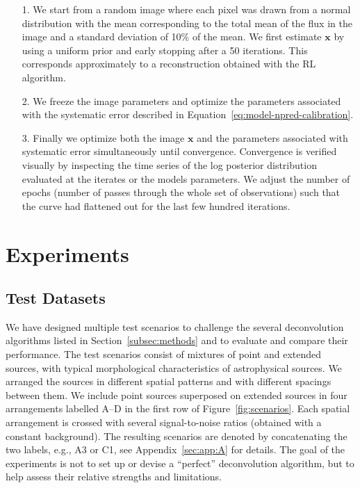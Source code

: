 \documentclass[twocolumn]{aastex631}
\begin{document}
    \begin{itemize}
        \item[1.] We start from a random image where each pixel was drawn from a normal distribution with the mean corresponding to the total mean of the flux in the image and a standard deviation of 10\% of the mean. We first estimate $\mathbf{x}$ by using a uniform prior and early stopping after a 50 iterations. This corresponds approximately to a reconstruction obtained with the RL algorithm. 
        \item[2.] We freeze the image parameters and optimize the parameters associated with the systematic error described in Equation~\ref{eq:model-npred-calibration}.
        \item[3.] Finally we optimize both the image $\mathbf{x}$ and the parameters associated with systematic error simultaneously until convergence. Convergence is verified visually by inspecting the time series of the log posterior distribution evaluated at the iterates or the models parameters. We adjust the number of epochs (number of passes through the whole set of observations) such that the curve had flattened out for the last few hundred iterations.
    \end{itemize}
    
    \section{Experiments}
    \subsection{Test Datasets}
    \label{subsec:test-datasets}
    We have designed multiple test scenarios to challenge the several deconvolution algorithms listed in Section~\ref{subsec:methods} and to evaluate and compare their performance. The test scenarios consist of mixtures of point and extended sources, with typical morphological characteristics of astrophysical sources. We arranged the sources in different spatial patterns and with different spacings between them. We include point sources superposed on extended sources in four arrangements labelled A--D in the first row of Figure~\ref{fig:scenarios}. Each spatial arrangement is crossed with several signal-to-noise ratios (obtained with a constant background). The resulting scenarios are denoted by concatenating the two labels, e.g., A3 or C1, see Appendix~\ref{sec:app:A} for details.  The goal of the experiments is not to set up or devise a \enquote{perfect} deconvolution algorithm, but to help assess their relative strengths and limitations.  
    
\end{document}
